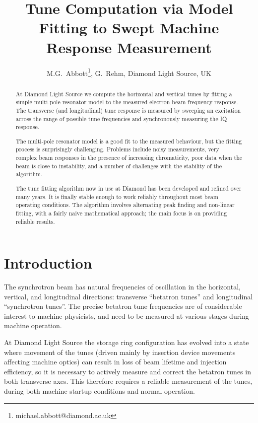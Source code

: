 \documentclass[
    a4paper,
    keeplastbox,            %
    hyphens,                %
    nospread,               %
    refpage,                %
]{jacow}
\begin{document}
\title{%
    Tune Computation via Model Fitting to Swept Machine Response Measurement}
\author{%
    M.G.~Abbott\thanks{michael.abbott@diamond.ac.uk},
    G.~Rehm, Diamond Light Source, UK}
\maketitle

\begin{abstract}

At Diamond Light Source we compute the horizontal and vertical tunes by fitting
a simple multi-pole resonator model to the measured electron beam frequency
response.  The transverse (and longitudinal) tune response is measured by
sweeping an excitation across the range of possible tune frequencies and
synchronously measuring the IQ response.

The multi-pole resonator model is a good fit to the measured behaviour, but the
fitting process is surprisingly challenging.  Problems include noisy
measurements, very complex beam responses in the presence of increasing
chromaticity, poor data when the beam is close to instability, and a number of
challenges with the stability of the algorithm.

The tune fitting algorithm now in use at Diamond has been developed and refined
over many years.  It is finally stable enough to work reliably throughout most
beam operating conditions.  The algorithm involves alternating peak finding and
non-linear fitting, with a fairly naive mathematical approach; the main focus is
on providing reliable results.

\end{abstract}


\section{Introduction}

The synchrotron beam has natural frequencies of oscillation in the horizontal,
vertical, and longitudinal directions: transverse ``betatron tunes'' and
longitudinal ``synchrotron tunes''.  The precise betatron tune frequencies are
of considerable interest to machine physicists, and need to be measured at
various stages during machine operation.

At Diamond Light Source the storage ring configuration has evolved into a state
where movement of the tunes (driven mainly by insertion device movements
affecting machine optics) can result in loss of beam lifetime and injection
efficiency, so it is necessary to actively measure and correct the betatron
tunes in both transverse axes.  This therefore requires a reliable measurement
of the tunes, during both machine startup conditions and normal operation.
\end{document}
